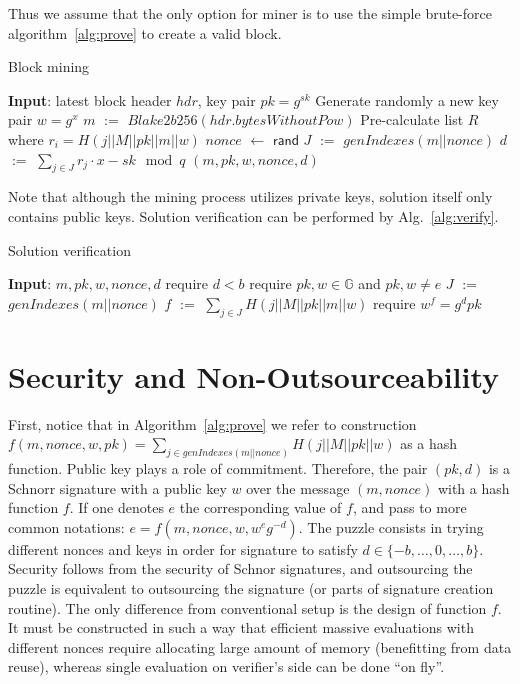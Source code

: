 \documentclass[]{article}
\def\Let#1#2{\State #1 $:=$ #2}
\def\LetRnd#1#2{\State #1 $\gets$ #2}
\begin{document}
    Thus we assume that the only option for miner is to use the simple brute-force algorithm~\ref{alg:prove} to
    create a valid block.

    \begin{algorithm}[H]
        \caption{Block mining}
        \label{alg:prove}
        \begin{algorithmic}[1]
            \State \textbf{Input}: latest block header $hdr$, key pair $pk=g^{sk}$
            \State Generate randomly a new key pair $w=g^x$
            \Let{$m$}{$Blake2b256(hdr.bytesWithoutPow)$}
            \State Pre-calculate list $R$ where $r_i=H(j||M||pk||m||w)$
            \LetRnd{$nonce$}{$\mathsf{rand}$}
            \Let{$J$}{$genIndexes(m||nonce)$}
            \Let{$d$}{$\sum_{j \in J}{r_j} \cdot x - sk \mod q$}
            \State \Return $(m,pk,w,nonce,d)$
            \EndIf
            \EndWhile
        \end{algorithmic}
    \end{algorithm}

    Note that although the mining process utilizes private keys, solution itself
    only contains public keys. Solution verification can be performed by Alg.~\ref{alg:verify}.

    \begin{algorithm}[H]
        \caption{Solution verification}
        \label{alg:verify}
        \begin{algorithmic}[1]
            \State \textbf{Input}: $m,pk,w,nonce,d$
            \State require $d < b$
            \State require $pk,w\in \mathbb{G}$ and $pk,w \ne e$
            \Let{$J$}{$genIndexes(m||nonce)$}
            \Let{$f$}{$\sum_{j \in J} H(j||M||pk||m||w)$}
            \State require $w^f = g^dpk$
        \end{algorithmic}
    \end{algorithm}

    \section{Security and Non-Outsourceability}
    First, notice that in Algorithm~\ref{alg:prove} we refer to construction
    $f(m,nonce,w,pk)=\sum_{j\in genIndexes(m||nonce)} H(j||M||pk||w)$ as a hash
    function. Public key plays a role of commitment. Therefore, the pair
    $(pk,d)$ is a Schnorr signature with a public key $w$ over the message
    $(m,nonce)$ with a hash function $f$. If one denotes $e$ the corresponding
    value of $f$, and pass to more common notations:
    $e=f(m,nonce,w,w^eg^{-d})$. The puzzle consists in trying
    different nonces and keys in order for signature to satisfy
    $d\in\{-b,\dots,0,\dots,b\}$. Security follows from the security of Schnor
    signatures, and outsourcing the puzzle is equivalent to outsourcing the
    signature (or parts of signature creation routine). The only difference from
    conventional setup is the design of function $f$. It must be constructed in such
    a way that efficient massive evaluations with different nonces require
    allocating large amount of memory (benefitting from data reuse), whereas
    single evaluation on verifier's side can be done ``on fly''.
\end{document}
